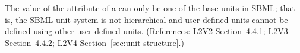 The value of the  attribute of a \Unit can only be
one of the base units in SBML; that is, the SBML unit
system is not hierarchical and user-defined units cannot be defined using
other user-defined units.  (References: L2V2 Section~4.4.1;
L2V3 Section~4.4.2; L2V4 Section~\ref{sec:unit-structure}.)
